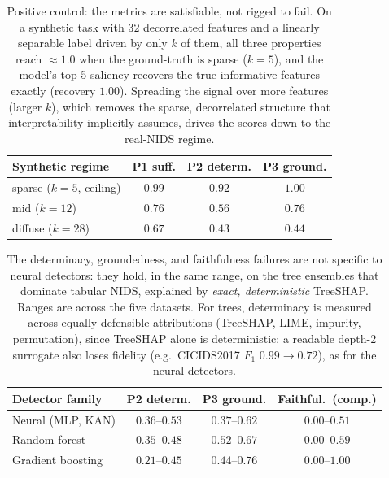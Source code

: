 \documentclass[conference]{IEEEtran}
\begin{document}
\begin{table}[t]
\centering
\caption{Positive control: the metrics are satisfiable, not rigged to fail. On a synthetic task
with $32$ decorrelated features and a linearly separable label driven by only $k$ of them, all
three properties reach $\approx 1.0$ when the ground-truth is sparse ($k{=}5$), and the model's
top-5 saliency recovers the true informative features exactly (recovery $1.00$). Spreading the
signal over more features (larger $k$), which removes the sparse, decorrelated structure that
interpretability implicitly assumes, drives the scores down to the real-NIDS regime.}
\label{tab:ceiling}
\small\setlength{\tabcolsep}{4pt}
\begin{tabular}{lccc}
\toprule
Synthetic regime & P1 suff. & P2 determ. & P3 ground. \\
\midrule
sparse ($k{=}5$, ceiling) & $\mathbf{0.99}$ & $\mathbf{0.92}$ & $\mathbf{1.00}$ \\
mid ($k{=}12$)            & $0.76$ & $0.56$ & $0.76$ \\
diffuse ($k{=}28$)        & $0.67$ & $0.43$ & $0.44$ \\
\bottomrule
\end{tabular}
\end{table}

\begin{table}[t]
\centering
\caption{The determinacy, groundedness, and faithfulness failures are not specific to neural
detectors: they hold, in the same range, on the tree ensembles that dominate tabular NIDS,
explained by \emph{exact, deterministic} TreeSHAP. Ranges are across the five datasets. For trees,
determinacy is measured across equally-defensible attributions (TreeSHAP, LIME, impurity,
permutation), since TreeSHAP alone is deterministic; a readable depth-2 surrogate also loses
fidelity (e.g.\ CICIDS2017 $F_1$ $0.99{\to}0.72$), as for the neural detectors.}
\label{tab:tree}
\small\setlength{\tabcolsep}{4pt}
\begin{tabular}{lccc}
\toprule
Detector family & P2 determ. & P3 ground. & Faithful.\ (comp.) \\
\midrule
Neural (MLP, KAN)   & $0.36$--$0.53$ & $0.37$--$0.62$ & $0.00$--$0.51$ \\
Random forest       & $0.35$--$0.48$ & $0.52$--$0.67$ & $0.00$--$0.59$ \\
Gradient boosting   & $0.21$--$0.45$ & $0.44$--$0.76$ & $0.00$--$1.00$ \\
\bottomrule
\end{tabular}
\end{table}
\end{document}
